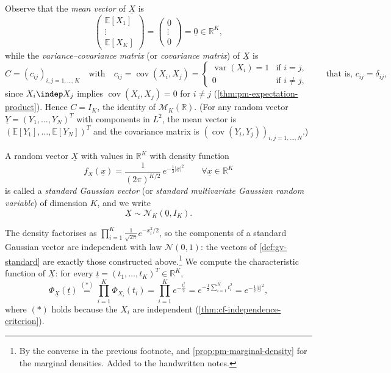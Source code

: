 Observe that the \emph{mean vector} of $\underline X$ is
\[
  \begin{pmatrix}\mathbb E[X_1]\\\vdots\\\mathbb E[X_K]\end{pmatrix}
  =\begin{pmatrix}0\\\vdots\\0\end{pmatrix}=\underline 0\in\mathbb R^K,
\]
while the \emph{variance--covariance matrix} (or \emph{covariance matrix}) of $\underline X$ is
\[
  C=(c_{ij})_{i,j=1,\dots,K}\quad\text{with}\quad
  c_{ij}=\operatorname{cov}(X_i,X_j)=\begin{cases}\operatorname{var}(X_i)=1&\text{if }i=j,\\
  0&\text{if }i\ne j,\end{cases}
  \qquad\text{that is, }c_{ij}=\delta_{ij},
\]
since $X_i\indep X_j$ implies $\operatorname{cov}(X_i,X_j)=0$ for $i\ne j$
(\cref{thm:pm-expectation-product}). Hence $C=I_K$, the identity of $\mathcal M_K(\mathbb R)$.
(For any random vector $\underline Y=(Y_1,\dots,Y_N)^T$ with components in $L^2$, the mean vector
is $(\mathbb E[Y_1],\dots,\mathbb E[Y_N])^T$ and the covariance matrix is
$(\operatorname{cov}(Y_i,Y_j))_{i,j=1,\dots,N}$.)

\begin{definition}\label{def:gv-standard}
A random vector $\underline X$ with values in $\mathbb R^K$ with density function
\[
  f_{\underline X}(\underline x)=\frac1{(2\pi)^{K/2}}\,e^{-\frac12|\underline x|^2}\qquad
  \forall\underline x\in\mathbb R^K
\]
is called a \emph{standard Gaussian vector} (or \emph{standard multivariate Gaussian random
variable}) of dimension $K$, and we write
\[
  \underline X\sim\mathcal N_K(\underline 0,I_K).
\]
\end{definition}

The density factorises as $\prod_{i=1}^K\frac1{\sqrt{2\pi}}e^{-x_i^2/2}$, so the components of a
standard Gaussian vector are independent with law $\mathcal N(0,1)$: the vectors of
\cref{def:gv-standard} are exactly those constructed above.\footnote{By the converse in the
previous footnote, and \cref{prop:pm-marginal-density} for the marginal densities. Added to the
handwritten notes.} We compute the characteristic function of $\underline X$: for every
$\underline t=(t_1,\dots,t_K)^T\in\mathbb R^K$,
\begin{equation}\label{eq:gv-cf-standard}
  \Phi_{\underline X}(\underline t)\overset{(\ast)}{=}\prod_{i=1}^K\Phi_{X_i}(t_i)
  =\prod_{i=1}^Ke^{-\frac{t_i^2}2}=e^{-\frac12\sum_{i=1}^Kt_i^2}=e^{-\frac12|\underline t|^2},
\end{equation}
where $(\ast)$ holds because the $X_i$ are independent (\cref{thm:cf-independence-criterion}).

